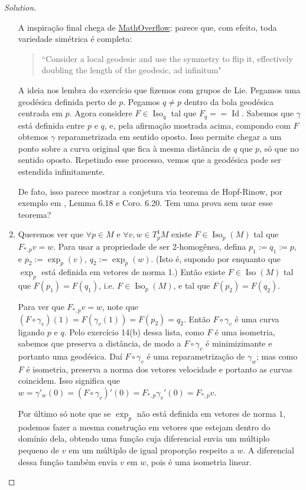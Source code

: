 \begin{proof}[Solution]
\begin{enumerate}[label=(\alph*)]
A inspiração final chega de \href{https://mathoverflow.net/questions/31009/action-of-the-group-of-isometries-on-a-manifold}{MathOverflow}: parece que, com efeito, toda variedade simétrica é completa:
\begin{quotation}
	``Consider a local geodesic and use the symmetry to flip it, effectively doubling the length of the geodesic, ad infinitum"
\end{quotation}
A ideia nos lembra do exercício que fizemos com grupos de Lie. Pegamos uma geodésica definida perto de \(p\). Pegamos \(q\neq p\) dentro da bola geodésica centrada em \(p\). Agora considere \(F \in \operatorname{Iso}_q\) tal que \(F_q = =\operatorname{Id}\). Sabemos que \(\gamma\) está definida entre \(p\) e \(q\), e, pela afirmação mostrada acima, compondo com \(F\) obtemos \(\gamma\) reparametrizada em sentido oposto. Isso permite chegar a um ponto sobre a curva original que fica à mesma distância de \(q\) que \(p\), só que no sentido oposto. Repetindo esse processo, vemos que a geodésica pode ser estendida infinitamente.

De fato, isso parece mostrar a conjetura via teorema de Hopf-Rinow, por exemplo em \cite{ler}, Lemma 6.18 e Coro. 6.20. Tem uma prova sem usar esse teorema?

\item Queremos ver que \(\forall p \in M\) e \(\forall v,w \in T^1_pM\) existe \(F \in \operatorname{Iso}_p(M)\) tal que \(F_{*,p}v=w\). Para usar a propriedade de ser 2-homogênea, defina  \(p_1:=q_1:=p\), e \(p_2:=\operatorname{exp}_p(v)\), \(q_2:=\operatorname{exp}_p(w)\). (Isto é, supondo por enquanto que \(\operatorname{exp}_p\) está definida em vetores de norma 1.) Então existe \(F \in \operatorname{Iso}(M)\) tal que \(F(p_1)=F(q_1)\), i.e. \(F \in \operatorname{Iso}_p(M)\), e tal que \(F(p_2)=F(q_2)\).

Para ver que \(F_{*,p}v=w\), note que \((F \circ \gamma_v)(1)=F(\gamma_v(1))=F(p_2)=q_2\). Então \(F \circ \gamma_v\) é uma curva ligando \(p\) e \(q\). Pelo exercício 14(b) dessa lista, como \(F\) é uma isometria, sabemos que preserva a distância, de modo a \(F \circ \gamma_v\) é minimizimante e portanto uma geodésica. Daí \(F \circ \gamma_v\) é uma reparametrização de \(\gamma_w\); mas como \(F\) é isometria, preserva a norma dos vetores velocidade e portanto as curvas coincidem. Isso significa que \(w=\gamma'_w(0)=(F \circ \gamma_v)'(0)=F_{*,p}\gamma_v'(0)=F_{*,p}v\).

Por último só note que se \(\operatorname{exp}_p\) não está definida em vetores de norma \(1\), podemos fazer a mesma construção em vetores que estejam dentro do domínio dela, obtendo uma função cuja diferencial envia um múltiplo pequeno de \(v\) em um múltiplo de igual proporção respeito a \(w\). A diferencial dessa função também envia \(v\) em \(w\), pois é uma isometria linear.
\end{enumerate}
\end{proof}

